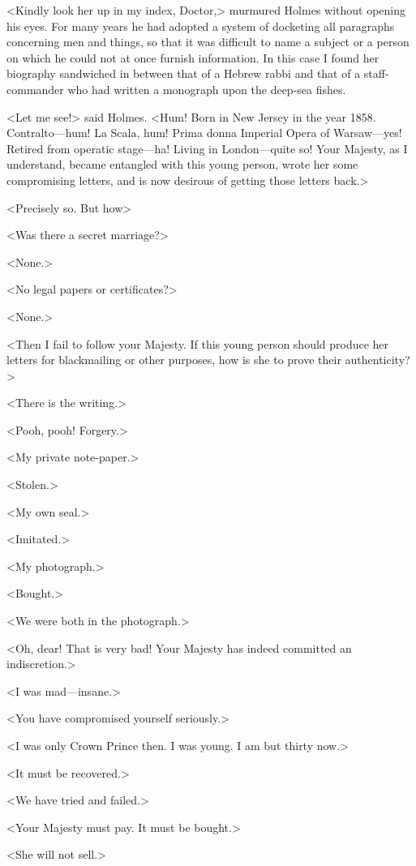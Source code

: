 <Kindly look her up in my index, Doctor,> murmured Holmes without opening his eyes. For many years he had adopted a system of docketing all paragraphs concerning men and things, so that it was difficult to name a subject or a person on which he could not at once furnish information. In this case I found her biography sandwiched in between that of a Hebrew rabbi and that of a staff-commander who had written a monograph upon the deep-sea fishes.

<Let me see!> said Holmes. <Hum! Born in New Jersey in the year 1858. Contralto—hum! La Scala, hum! Prima donna Imperial Opera of Warsaw—yes! Retired from operatic stage—ha! Living in London—quite so! Your Majesty, as I understand, became entangled with this young person, wrote her some compromising letters, and is now desirous of getting those letters back.>

<Precisely so. But how\longdash>

<Was there a secret marriage?>

<None.>

<No legal papers or certificates?>

<None.>

<Then I fail to follow your Majesty. If this young person should produce her letters for blackmailing or other purposes, how is she to prove their authenticity?>

<There is the writing.>

<Pooh, pooh! Forgery.>

<My private note-paper.>

<Stolen.>

<My own seal.>

<Imitated.>

<My photograph.>

<Bought.>

<We were both in the photograph.>

<Oh, dear! That is very bad! Your Majesty has indeed committed an indiscretion.>

<I was mad—insane.>

<You have compromised yourself seriously.>

<I was only Crown Prince then. I was young. I am but thirty now.>

<It must be recovered.>

<We have tried and failed.>

<Your Majesty must pay. It must be bought.>

<She will not sell.>

